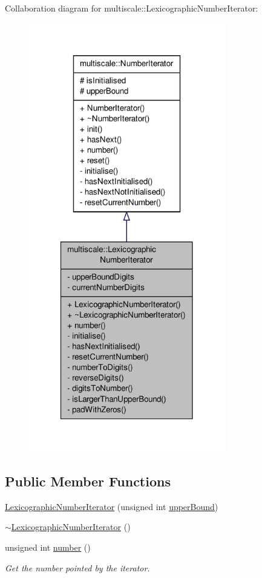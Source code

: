 Collaboration diagram for multiscale\-:\-:Lexicographic\-Number\-Iterator\-:\nopagebreak
\begin{figure}[H]
\begin{center}
\leavevmode
\includegraphics[width=242pt]{classmultiscale_1_1LexicographicNumberIterator__coll__graph}
\end{center}
\end{figure}
\subsection*{Public Member Functions}
\begin{DoxyCompactItemize}
\item 
\hyperlink{classmultiscale_1_1LexicographicNumberIterator_a02a95a6f7876b84909e08555730ff08a}{Lexicographic\-Number\-Iterator} (unsigned int \hyperlink{classmultiscale_1_1NumberIterator_a56a5558958778bbde64e249d67cba886}{upper\-Bound})
\item 
\hyperlink{classmultiscale_1_1LexicographicNumberIterator_affe04d9733b7d0984a5ab3957cb0096a}{$\sim$\-Lexicographic\-Number\-Iterator} ()
\item 
unsigned int \hyperlink{classmultiscale_1_1LexicographicNumberIterator_a282d970d0d1a33d2736bbdf104c18336}{number} ()
\begin{DoxyCompactList}\small\item\em Get the number pointed by the iterator. \end{DoxyCompactList}\end{DoxyCompactItemize}
